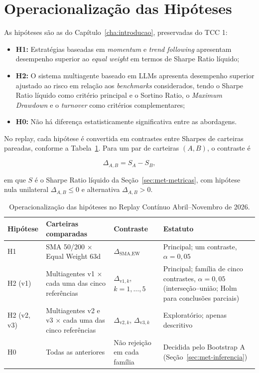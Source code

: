 \section{Operacionalização das Hipóteses}
\label{sec:met-hipoteses}

As hipóteses são as do Capítulo~\ref{cha:introducao}, preservadas do TCC 1:

\begin{itemize}
    \item \textbf{H1:} Estratégias baseadas em \textit{momentum} e \textit{trend following} apresentam desempenho superior ao \textit{equal weight} em termos de Sharpe Ratio líquido;
    \item \textbf{H2:} O sistema multiagente baseado em LLMs apresenta desempenho superior ajustado ao risco em relação aos \textit{benchmarks} considerados, tendo o Sharpe Ratio líquido como critério principal e o Sortino Ratio, o \textit{Maximum Drawdown} e o \textit{turnover} como critérios complementares;
    \item \textbf{H0:} Não há diferença estatisticamente significativa entre as abordagens.
\end{itemize}

No replay, cada hipótese é convertida em contrastes entre Sharpes de carteiras pareadas, conforme a Tabela~\ref{tab:met-hipoteses}. Para um par de carteiras $(A, B)$, o contraste é

\begin{equation}
\Delta_{A,B} = S_A - S_B,
\label{eq:met-contraste}
\end{equation}

\noindent em que $S$ é o Sharpe Ratio líquido da Seção~\ref{sec:met-metricas}, com hipótese nula unilateral $\Delta_{A,B} \leq 0$ e alternativa $\Delta_{A,B} > 0$.

\begin{table}[htbp]
\centering
\caption{Operacionalização das hipóteses no Replay Contínuo Abril--Novembro de 2026.}
\label{tab:met-hipoteses}
\small
\begin{tabular}{>{\raggedright\arraybackslash}p{1.8cm} >{\raggedright\arraybackslash}p{4.2cm} >{\raggedright\arraybackslash}p{3.2cm} >{\raggedright\arraybackslash}p{4.4cm}}
\toprule
\textbf{Hipótese} & \textbf{Carteiras comparadas} & \textbf{Contraste} & \textbf{Estatuto} \\
\midrule
H1 & SMA 50/200 $\times$ Equal Weight 63d & $\Delta_{\text{SMA},\text{EW}}$ & Principal; um contraste, $\alpha = 0{,}05$ \\
H2 (v1) & Multiagentes v1 $\times$ cada uma das cinco referências & $\Delta_{\text{v1},k}$, $k = 1,\ldots,5$ & Principal; família de cinco contrastes, $\alpha = 0{,}05$ (interseção--união; Holm para conclusões parciais) \\
H2 (v2, v3) & Multiagentes v2 e v3 $\times$ cada uma das cinco referências & $\Delta_{\text{v2},k}$, $\Delta_{\text{v3},k}$ & Exploratório; apenas descritivo \\
H0 & Todas as anteriores & Não rejeição em cada família & Decidida pelo Bootstrap A (Seção~\ref{sec:met-inferencia}) \\
\bottomrule
\end{tabular}
\end{table}

